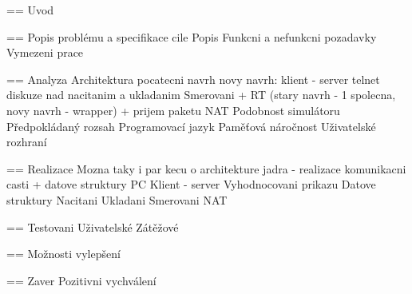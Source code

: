 

== Uvod

== Popis problému a specifikace cile
Popis
Funkcni a nefunkcni pozadavky
Vymezeni prace

== Analyza
Architektura
  pocatecni navrh
  novy navrh: klient - server
  telnet
  diskuze nad nacitanim a ukladanim
  Smerovani + RT (stary navrh - 1 spolecna, novy navrh - wrapper) + prijem paketu
  NAT 
Podobnost simulátoru
Předpokládaný rozsah
Programovací jazyk
Paměťová náročnost
Uživatelské rozhraní

== Realizace
Mozna taky i par kecu o architekture jadra - realizace komunikacni casti + datove struktury PC
  Klient - server
  Vyhodnocovani prikazu
  Datove struktury
Nacitani
Ukladani
Smerovani
NAT

== Testovani
Uživatelské
Zátěžové

== Možnosti vylepšení

== Zaver
Pozitivni vychválení
